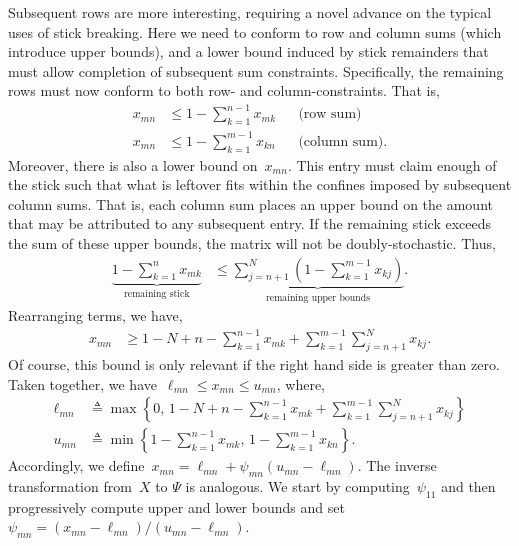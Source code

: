 \documentclass[twoside]{article}
\begin{document}
Subsequent rows are more interesting, requiring a novel advance on the
typical uses of stick breaking. Here we need to conform to row and
column sums (which introduce upper bounds), and a lower bound
induced by stick remainders that must allow completion of subsequent
sum constraints.  Specifically, the remaining rows must now conform to
both row- and column-constraints. That is,
\begin{align*}
x_{mn} &\leq 1- \sum_{k=1}^{n-1} x_{mk} & & \text{(row sum)} \\
x_{mn} &\leq 1- \sum_{k=1}^{m-1} x_{kn} & & \text{(column sum)}.
\end{align*}
Moreover, there is also a lower bound on~$x_{mn}$. This entry must
claim enough of the stick such that what is leftover fits within
the confines imposed by subsequent column sums. That is, each column
sum places an upper bound on the amount that may be attributed to any
subsequent entry. If the remaining stick exceeds the sum of these
upper bounds, the matrix will not be doubly-stochastic.  Thus,
\begin{align*}
\underbrace{1 - \sum_{k=1}^n x_{mk}}_{\text{remaining stick}}
  &\leq \underbrace{\sum_{j=n+1}^N (1- \sum_{k=1}^{m-1} x_{kj})}_{
    \text{remaining upper bounds}}.
\end{align*}
Rearranging terms, we have,
\begin{align*}
  x_{mn} &\geq
1 - N + n - \sum_{k=1}^{n-1} x_{mk}  +  \sum_{k=1}^{m-1} \sum_{j=n+1}^N x_{kj}.
\end{align*}
Of course, this bound is only relevant if the right hand side is greater than zero.
Taken together, we have~$\ell_{mn} \leq x_{mn} \leq u_{mn}$, where,
\begin{align*}
\ell_{mn} &\triangleq \max \left \{0, \, 1 - N + n - \sum_{k=1}^{n-1} x_{mk}  +  \sum_{k=1}^{m-1} \sum_{j=n+1}^N x_{kj} \right \}
\\
u_{mn} &\triangleq 
\min \left \{1- \sum_{k=1}^{n-1} x_{mk}, \,
1- \sum_{k=1}^{m-1} x_{kn} \right\}.
\end{align*}
Accordingly, we define~${x_{mn} = \ell_{mn} + \psi_{mn} (u_{mn} - \ell_{mn})}$.
The inverse transformation from~$X$ to $\Psi$ is analogous.
We start by computing~$\psi_{11}$ and then progressively compute
upper and lower bounds and set~${\psi_{mn} = (x_{mn} - \ell_{mn})/(u_{mn} - \ell_{mn})}$.
\end{document}
